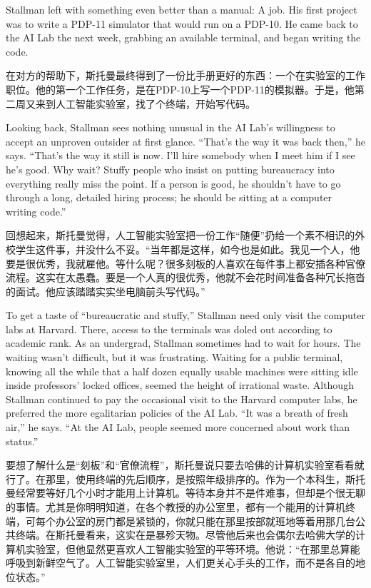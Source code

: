 \ifdefined\eng
Stallman left with something even better than a manual: A job.  His first project was to write a PDP-11 simulator that would run on a PDP-10. He came back to the AI Lab the next week, grabbing an available terminal, and began writing the code.
\fi

\ifdefined\chs
在对方的帮助下，斯托曼最终得到了一份比手册更好的东西：一个在实验室的工作职位。他的第一个工作任务，是在PDP-10上写一个PDP-11的模拟器。于是，他第二周又来到人工智能实验室，找了个终端，开始写代码。
\fi

\ifdefined\eng
Looking back, Stallman sees nothing unusual in the AI Lab's willingness to accept an unproven outsider at first glance. ``That's the way it was back then,'' he says. ``That's the way it still is now. I'll hire somebody when I meet him if I see he's good. Why wait? Stuffy people who insist on putting bureaucracy into everything really miss the point. If a person is good, he shouldn't have to go through a long, detailed hiring process; he should be sitting at a computer writing code.''
\fi

\ifdefined\chs
回想起来，斯托曼觉得，人工智能实验室把一份工作``随便''扔给一个素不相识的外校学生这件事，并没什么不妥。``当年都是这样，如今也是如此。我见一个人，他要是很优秀，我就雇他。等什么呢？很多刻板的人喜欢在每件事上都安插各种官僚流程。这实在太愚蠢。要是一个人真的很优秀，他就不会花时间准备各种冗长拖沓的面试。他应该踏踏实实坐电脑前头写代码。''
\fi

\ifdefined\eng
To get a taste of ``bureaucratic and stuffy,'' Stallman need only visit the computer labs at Harvard. There, access to the terminals was doled out according to academic rank. As an undergrad, Stallman sometimes had to wait for hours. The waiting wasn't difficult, but it was frustrating. Waiting for a public terminal, knowing all the while that a half dozen equally usable machines were sitting idle inside professors' locked offices, seemed the height of irrational waste. Although Stallman continued to pay the occasional visit to the Harvard computer labs, he preferred the more egalitarian policies of the AI Lab. ``It was a breath of fresh air,'' he says. ``At the AI Lab, people seemed more concerned about work than status.''
\fi

\ifdefined\chs
要想了解什么是``刻板''和``官僚流程''，斯托曼说只要去哈佛的计算机实验室看看就行了。在那里，使用终端的先后顺序，是按照年级排序的。作为一个本科生，斯托曼经常要等好几个小时才能用上计算机。等待本身并不是件难事，但却是个很无聊的事情。尤其是你明明知道，在各个教授的办公室里，都有一个能用的计算机终端，可每个办公室的房门都是紧锁的，你就只能在那里按部就班地等着用那几台公共终端。在斯托曼看来，这实在是暴殄天物。尽管他后来也会偶尔去哈佛大学的计算机实验室，但他显然更喜欢人工智能实验室的平等环境。他说：``在那里总算能呼吸到新鲜空气了。人工智能实验室里，人们更关心手头的工作，而不是各自的地位状态。''
\fi

